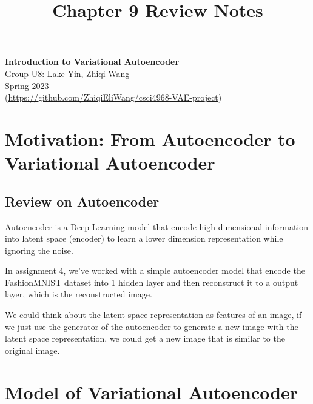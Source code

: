 \documentclass[11pt]{article}
\theoremstyle{definition}
\begin{document}
\setcounter{section}{0}
\title{Chapter 9 Review Notes}

\thispagestyle{empty}

\begin{center}
{\LARGE \bf Introduction to Variational Autoencoder}\\
{\large Group U8: Lake Yin, Zhiqi Wang}\\
Spring 2023\\
(\href{https://github.com/ZhiqiEliWang/csci4968-VAE-project}{https://github.com/ZhiqiEliWang/csci4968-VAE-project})
\end{center}
\section{Motivation: From Autoencoder to Variational Autoencoder}
\subsection{Review on Autoencoder}
Autoencoder is a Deep Learning model that encode high dimensional information into latent space (encoder) to learn a lower dimension representation while ignoring the noise. 

In assignment 4, we've worked with a simple autoencoder model that encode the FashionMNIST dataset into 1 hidden layer and then reconstruct it to a output layer, which is the reconstructed image.

We could think about the latent space representation as features of an image, if we just use the generator of the autoencoder to generate a new image with the latent space representation, we could get a new image that is similar to the original image.

\section{Model of Variational Autoencoder}
\end{document}

